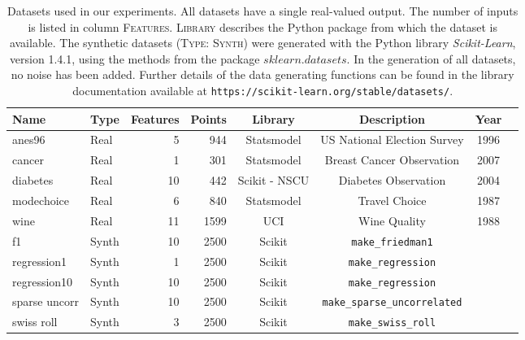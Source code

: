 \documentclass{article}
\begin{document}
\begin{table}[tb]
 \begin{center}
 \begin{small}
 \begin{sc}
 \begin{tabular}{llrrcccc}
 \toprule
 Name & Type & Features & Points & Library & Description & Year\\
 
  \midrule
  anes96 & Real & 5 & 944 & Statsmodel & US National Election Survey & 1996\\
  cancer & Real & 1 & 301 & Statsmodel & Breast Cancer Observation & 2007 \\
  diabetes & Real & 10 & 442 & Scikit - NSCU & Diabetes Observation & 2004\\
  modechoice & Real & 6 & 840 & Statsmodel & Travel Choice & 1987 \\
  wine & Real & 11 & 1599 & UCI & Wine Quality & 1988 \\
  \cline{2-7} 
  f1 & Synth & 10 & 2500 & Scikit & \texttt{\textup{make\_friedman1}} \\
regression1 & Synth & 1 & 2500 & Scikit & \texttt{\textup{make\_regression}} \\
  regression10 & Synth & 10 & 2500 & Scikit & \texttt{\textup{make\_regression}}\\
  sparse uncorr & Synth & 10 & 2500 & Scikit & \texttt{\textup{make\_sparse\_uncorrelated}}\\
  swiss roll & Synth & 3 & 2500 & Scikit & \texttt{\textup{make\_swiss\_roll}} \\

  \bottomrule
  \end{tabular}
  \end{sc}
  \end{small}
  \end{center}
  \caption{Datasets used in our experiments. All datasets have a single real-valued output. 
  The number of inputs is listed in column \textsc{Features}. 
  \textsc{Library} describes the Python package from which the dataset is available.
  The synthetic datasets (\textsc{Type: Synth}) were generated with the Python library \emph{Scikit-Learn}, version 1.4.1, using the methods from the package $sklearn.datasets$. 
  In the generation of all datasets, no noise has been added.
  Further details of the data generating functions can be found in the library documentation available at \texttt{\textup{https://scikit-learn.org/stable/datasets/}}.
  }
  \label{tab:data-table} 
\end{table}
\end{document}
